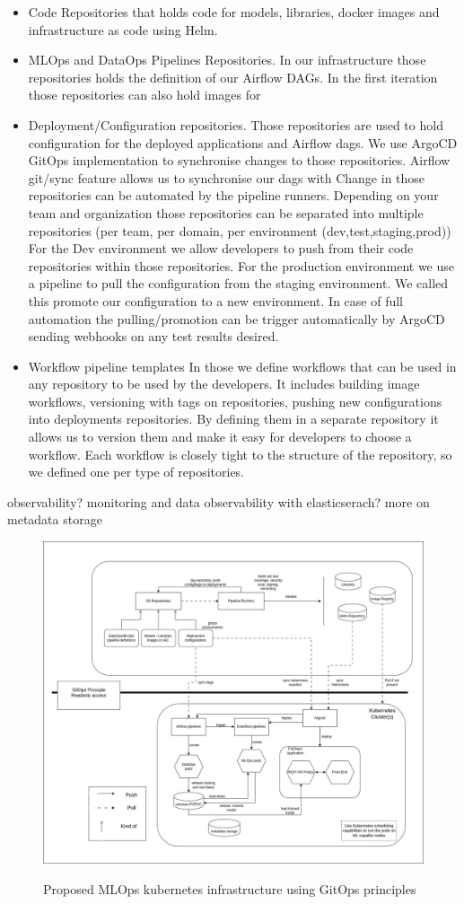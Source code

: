 \begin{itemize}
    \item Code Repositories that holds code for models, libraries, docker images and infrastructure as code using Helm.
    \item MLOps and DataOps Pipelines Repositories.
    In our infrastructure those repositories holds the definition of our Airflow DAGs.
    In the first iteration those repositories can also hold images for
    \item Deployment/Configuration repositories.
    Those repositories are used to hold configuration for the deployed applications and Airflow dags.
    We use ArgoCD GitOps implementation to synchronise changes to those repositories.
    Airflow git/sync feature allows us to synchronise our dags with
    Change in those repositories can be automated by the pipeline runners.
    Depending on your team and organization those repositories can be separated into multiple repositories (per team, per domain, per environment (dev,test,staging,prod))
    For the Dev environment we allow developers to push from their code repositories within those repositories.
    For the production environment we use a pipeline to pull the configuration from the staging environment.
    We called this promote our configuration to a new environment.
    In case of full automation the pulling/promotion can be trigger automatically by ArgoCD sending webhooks on any test results desired.
    \item Workflow pipeline templates
    In those we define workflows that can be used in any repository to be used by the developers.
    It includes building image workflows, versioning with tags on repositories, pushing new configurations into deployments repositories.
    By defining them in a separate repository it allows us to version them and make it easy for developers to choose a workflow.
    Each workflow is closely tight to the structure of the repository, so we defined one per type of repositories.
\end{itemize}

observability? monitoring and data observability with elasticserach?
more on metadata storage

\begin{figure}[!htbp]
    \centering
    \caption{Proposed MLOps kubernetes infrastructure using GitOps principles}
    \includegraphics[scale=0.35]{images/project/mthmlops-infra}
    \label{fig:project-infra}
\end{figure}
